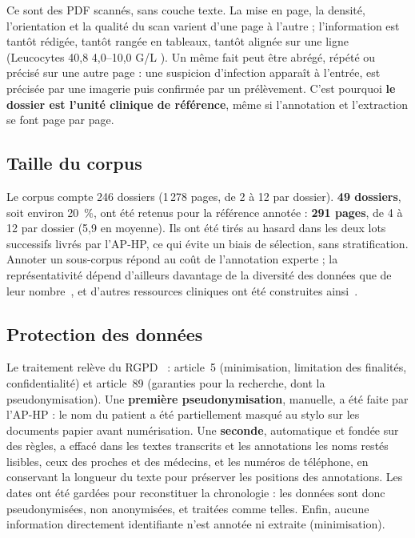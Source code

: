 Ce sont des PDF scannés, sans couche texte. La mise en page, la densité, l’orientation et la qualité du scan varient d’une page à l’autre ; l’information est tantôt rédigée, tantôt rangée en tableaux, tantôt alignée sur une ligne (\og Leucocytes 40,8 4,0–10,0 G/L \fg{}). Un même fait peut être abrégé, répété ou précisé sur une autre page : une suspicion d’infection apparaît à l’entrée, est précisée par une imagerie puis confirmée par un prélèvement. C’est pourquoi \textbf{le dossier est l’unité clinique de référence}, même si l’annotation et l’extraction se font page par page.

\subsection{Taille du corpus}\label{sec:c3-3-2-3}

Le corpus compte 246 dossiers (1\,278 pages, de 2 à 12 par dossier). \textbf{49 dossiers}, soit environ 20~\%, ont été retenus pour la référence annotée : \textbf{291 pages}, de 4 à 12 par dossier (5,9 en moyenne). Ils ont été tirés au hasard dans les deux lots successifs livrés par l’AP-HP, ce qui évite un biais de sélection, sans stratification. Annoter un sous-corpus répond au coût de l’annotation experte ; la représentativité dépend d’ailleurs davantage de la diversité des données que de leur nombre~\cite{biber1993}, et d’autres ressources cliniques ont été construites ainsi~\cite{roberts2007clef,patel2018annotation}.

\subsection{Protection des données}\label{sec:c3-3-2-4}

Le traitement relève du RGPD~\cite{rgpd2016} : article~5 (minimisation, limitation des finalités, confidentialité) et article~89 (garanties pour la recherche, dont la pseudonymisation). Une \textbf{première pseudonymisation}, manuelle, a été faite par l’AP-HP : le nom du patient a été partiellement masqué au stylo sur les documents papier avant numérisation. Une \textbf{seconde}, automatique et fondée sur des règles, a effacé dans les textes transcrits et les annotations les noms restés lisibles, ceux des proches et des médecins, et les numéros de téléphone, en conservant la longueur du texte pour préserver les positions des annotations. Les dates ont été gardées pour reconstituer la chronologie : les données sont donc pseudonymisées, non anonymisées, et traitées comme telles. Enfin, aucune information directement identifiante n’est annotée ni extraite (minimisation).

